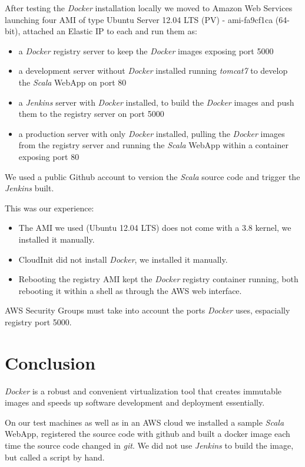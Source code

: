 \documentclass[captions=tableheading]{article}
\begin{document}
After testing the \emph{Docker} installation locally we moved to Amazon Web Services launching four AMI  of type Ubuntu Server 12.04 LTS (PV) - ami-fa9cf1ca (64-bit), attached an Elastic IP to each and run them as:
\begin{itemize}
\item a \emph{Docker} registry server to keep the \emph{Docker} images exposing port 5000
\item a development server  without \emph{Docker} installed running \emph{tomcat7} to develop the  \emph{Scala} WebApp on port 80
\item a \emph{Jenkins} server with \emph{Docker} installed, to build the \emph{Docker} images and push them to the registry server on port 5000
\item a production server with only \emph{Docker} installed, pulling the \emph{Docker} images from the registry server and running the  \emph{Scala} WebApp within a container exposing port 80
\end{itemize}
We used a public Github account to version the \emph{Scala} source code and trigger the \emph{Jenkins} built.

This was our experience:
\begin{itemize}
\item The AMI we used (Ubuntu 12.04 LTS) does not come with a 3.8 kernel, we installed it  manually.
\item CloudInit did not install \emph{Docker}, we installed it  manually.
\item Rebooting the registry AMI kept the \emph{Docker} registry container running, both rebooting it within a shell as through the AWS web interface.
\end{itemize}

AWS Security Groups must take into account the ports \emph{Docker} uses, espacially registry port 5000.
\section{Conclusion}
\label{sec-9}

\emph{Docker} is a robust and convenient virtualization tool that creates immutable images and speeds up software development and deployment essentially.  

On our test machines as well as in an AWS cloud we installed a sample \emph{Scala} WebApp, registered the source code with github and built a docker image each time the source code changed in \emph{git}. We did not use \emph{Jenkins} to build the image, but called a script by hand. 
\end{document}
